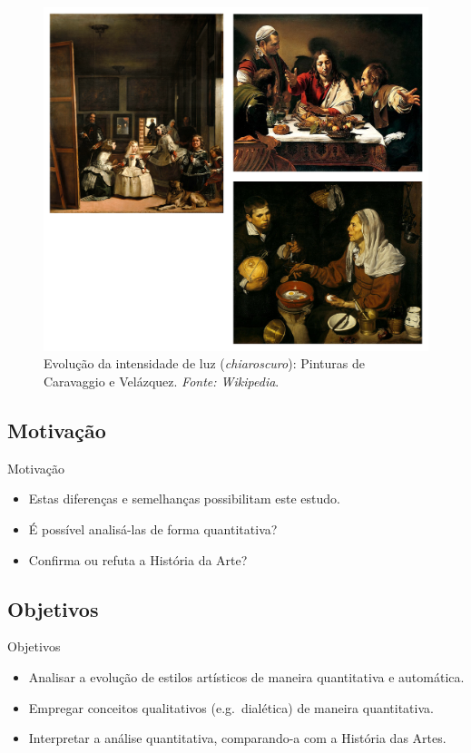 \documentclass{beamer}
\begin{document}
\begin{frame}

\begin{figure}
\begin{center}
    \includegraphics[height=0.55\textwidth]{figs/fig_car_vel.png}
  \end{center}
  \caption{Evolução da intensidade de luz (\textit{chiaroscuro}): Pinturas de Caravaggio e Velázquez. \textit{Fonte: Wikipedia}.}
  \label{fig:carvel}
\end{figure}

\end{frame}

\subsection{Motivação}
\begin{frame}{Motivação}
\begin{itemize}
  \item Estas diferenças e semelhanças possibilitam este estudo.
  \item É possível analisá-las de forma quantitativa?
  \item Confirma ou refuta a História da Arte?
\end{itemize}

\end{frame}

\subsection{Objetivos}
\begin{frame}{Objetivos}
\begin{itemize}
  \item Analisar a evolução de estilos artísticos de maneira quantitativa e automática.
  \pause
  \item Empregar conceitos qualitativos (e.g.\ dialética) de maneira quantitativa.
  \pause
  \item Interpretar a análise quantitativa, comparando-a com a História das Artes.
\end{itemize}

\end{frame}
\end{document}
